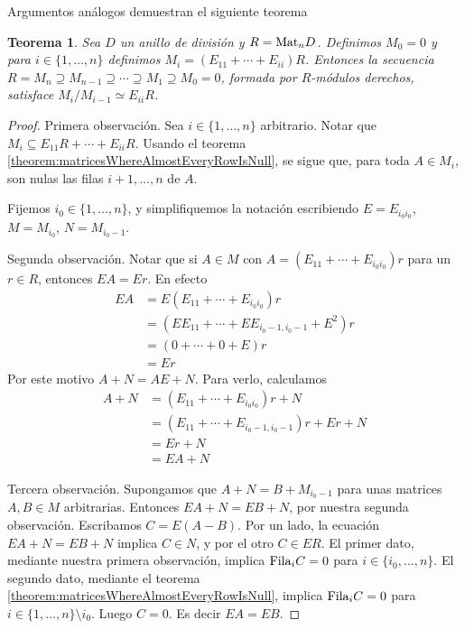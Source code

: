 \documentclass{report}
\newcommand{\Mat}{\textnormal{Mat}}
\newcommand{\Fila}{\textnormal{Fila}}
\newtheorem{theorem}{Teorema}
\begin{document}
  Argumentos análogos demuestran el siguiente teorema
  \begin{theorem}
    \label{theorem:compositionSeriesOfRightModulesForMatrixRing}
    Sea \(D\) un anillo de división y \(R = \Mat_n D\).
    Definimos \(M_0 = 0\) y para \(i \in \{1, \dots, n\}\) definimos \(M_i = (E_{1 1} + \cdots + E_{i i}) R\).
    Entonces la secuencia \(R = M_n \supseteq M_{n - 1} \supseteq \cdots \supseteq M_1 \supseteq M_0 = 0\), formada por \(R\)-módulos derechos, satisface \(M_i / M_{i - 1} \simeq E_{i i} R\).
  \end{theorem}
  \begin{proof}
    Primera observación.
    Sea \(i \in \{1, \dots, n\}\) arbitrario.
    Notar que \(M_i \subseteq E_{1 1} R + \cdots + E_{i i} R\).
    Usando el teorema \ref{theorem:matricesWhereAlmostEveryRowIsNull}, se sigue que, para toda \(A \in M_i\), son nulas las filas \(i + 1, \dots, n\) de \(A\).

    Fijemos \(i_0 \in \{1, \dots, n\}\), y simplifiquemos la notación escribiendo \(E = E_{i_0 i_0}\), \(M = M_{i_0}\), \(N = M_{i_0 - 1}\).

    Segunda observación.
    Notar que si \(A \in M\) con \(A = (E_{1 1} + \cdots + E_{i_0 i_0}) r\) para un \(r \in R\), entonces \(E A = E r\).
    En efecto
    \begin{align}
      E A
      &=
      E (E_{1 1} + \cdots + E_{i_0 i_0}) r
      \\
      &=
      (E E_{1 1} + \cdots + E E_{i_0 - 1, i_0 - 1} + E^2) r
      \\
      &=
      (0 + \cdots + 0 + E) r
      \\
      &=
      E r
    \end{align}
    Por este motivo \(A + N = A E + N\).
    Para verlo, calculamos
    \begin{align}
      A + N
      &=
      (E_{1 1} + \cdots + E_{i_0 i_0}) r + N
      \\
      &=
      (E_{1 1} + \cdots + E_{i_0 - 1, i_0 - 1}) r + E r + N
      \\
      &=
      E r + N
      \\
      &=
      E A + N
    \end{align}

    Tercera observación.
    Supongamos que \(A + N = B + M_{i_0 -1}\) para unas matrices \(A, B \in M\) arbitrarias.
    Entonces \(E A + N = E B + N\), por nuestra segunda observación.
    Escribamos \(C = E (A - B)\).
    Por un lado, la ecuación \(E A + N = E B + N\) implica \(C \in N\), y por el otro \(C \in E R\).
    El primer dato, mediante nuestra primera observación, implica \(\Fila_i C = 0\) para \(i \in \{i_0, \dots, n\}\).
    El segundo dato, mediante el teorema \ref{theorem:matricesWhereAlmostEveryRowIsNull}, implica \(\Fila_i C = 0\) para \(i \in \{1, \dots, n\} \setminus i_0\).
    Luego \(C = 0\).
    Es decir \(E A = E B\).


\end{proof}
\end{document}
